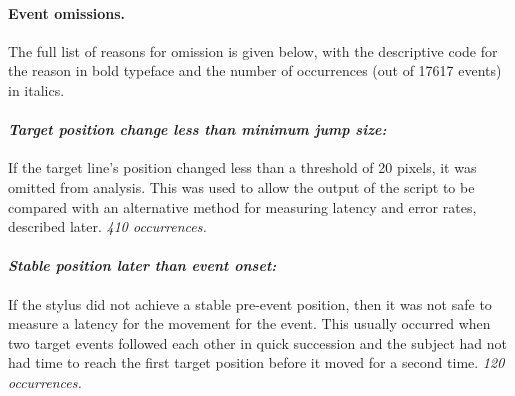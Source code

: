 
\paragraph{Event omissions.} The full list of reasons for omission
is given below, with the descriptive code for the reason in bold
typeface and the number of occurrences (out of 17617 events) in
italics.



\paragraph{\emph{Target position change less than minimum jump size:}} If the
target line's position changed less than a threshold of 20 pixels, it
was omitted from analysis. This was used to allow the output of the
script to be compared with an alternative method for measuring latency
and error rates, described later. \emph{410 occurrences.}

\paragraph{\emph{Stable position later than event onset:}} If the stylus did not
achieve a stable pre-event position, then it was not safe to measure a
latency for the movement for the event. This usually occurred when two
target events followed each other in quick succession and the subject
had not had time to reach the first target position before it moved
for a second time. \emph{120 occurrences.}

%

